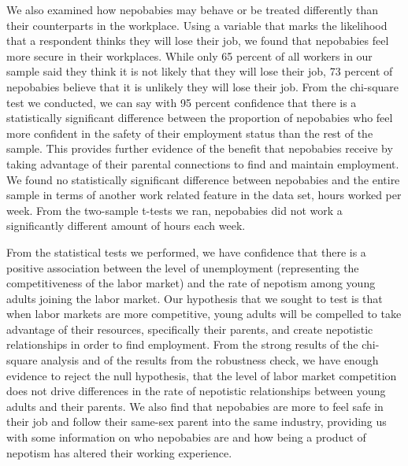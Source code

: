 \documentclass[12pt]{article}
\begin{document}
We also examined how nepobabies may behave or be treated differently than their counterparts in the workplace. Using a variable that marks the likelihood that a respondent thinks they will lose their job, we found that nepobabies feel more secure in their workplaces. While only 65 percent of all workers in our sample said they think it is not likely that they will lose their job, 73 percent of nepobabies believe that it is unlikely they will lose their job. From the chi-square test we conducted, we can say with 95 percent confidence that there is a statistically significant difference between the proportion of nepobabies who feel more confident in the safety of their employment status than the rest of the sample. This provides further evidence of the benefit that nepobabies receive by taking advantage of their parental connections to find and maintain employment. We found no statistically significant difference between nepobabies and the entire sample in terms of another work related feature in the data set, hours worked per week. From the two-sample t-tests we ran, nepobabies did not work a significantly different amount of hours each week.

From the statistical tests we performed, we have confidence that there is a positive association between the level of unemployment (representing the competitiveness of the labor market) and the rate of nepotism among young adults joining the labor market. Our hypothesis that we sought to test is that when labor markets are more competitive, young adults will be compelled to take advantage of their resources, specifically their parents, and create nepotistic relationships in order to find employment. From the strong results of the chi-square analysis and of the results from the robustness check, we have enough evidence to reject the null hypothesis, that the level of labor market competition does not drive differences in the rate of nepotistic relationships between young adults and their parents. We also find that nepobabies are more to feel safe in their job and follow their same-sex parent into the same industry, providing us with some information on who nepobabies are and how being a product of nepotism has altered their working experience.

 
\end{document}
